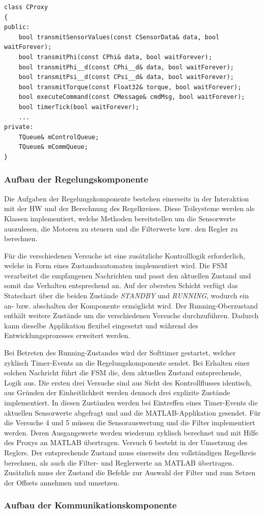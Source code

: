 \documentclass{article}
\begin{document}
\begin{lstlisting}
class CProxy
{
public:
	bool transmitSensorValues(const CSensorData& data, bool waitForever);
	bool transmitPhi(const CPhi& data, bool waitForever);
	bool transmitPhi__d(const CPhi__d& data, bool waitForever);
	bool transmitPsi__d(const CPsi__d& data, bool waitForever);
	bool transmitTorque(const Float32& torque, bool waitForever);
	bool executeCommand(const CMessage& cmdMsg, bool waitForever);
	bool timerTick(bool waitForever);
	...
private:
	TQueue& mControlQueue;
	TQueue& mCommQueue;
}
\end{lstlisting}

\subsubsection{Aufbau der Regelungskomponente}
Die Aufgaben der Regelungskomponente bestehen einerseits in der Interaktion mit der HW und der Berechnung des Regelkreises. Diese Teilsysteme werden als Klassen implementiert, welche Methoden bereitstellen um die Sensorwerte auszulesen, die Motoren zu steuern und die Filterwerte bzw. den Regler zu berechnen.


Für die verschiedenen Versuche ist eine zusätzliche Kontrolllogik erforderlich, welche in Form eines Zustandsautomaten implementiert wird. Die FSM verarbeitet die empfangenen Nachrichten und passt den aktuellen Zustand und somit das Verhalten entsprechend an. Auf der obersten Schicht verfügt das Statechart über die beiden Zustände \textit{STANDBY} und \textit{RUNNING}, wodurch ein an- bzw. abschalten der Komponente ermöglicht wird. Der Running-Oberzustand enthält weitere Zustände um die verschiedenen Versuche durchzuführen. Dadurch kann dieselbe Applikation flexibel eingesetzt und während des Entwicklungsprozesses erweitert werden.


Bei Betreten des Running-Zustandes wird der Softtimer gestartet, welcher zyklisch Timer-Events an die Regelungskomponente sendet. Bei Erhalten einer solchen Nachricht führt die FSM die, dem aktuellen Zustand entsprechende, Logik aus. 
Die ersten drei Versuche sind aus Sicht des Kontrollflusses identisch, aus Gründen der Einheitlichkeit werden dennoch drei explizite Zustände implementiert. In diesen Zuständen werden bei Eintreffen eines Timer-Events die aktuellen Sensorwerte abgefragt und and die MATLAB-Applikation gesendet. Für die Versuche 4 und 5 müssen die Sensorauswertung und die Filter implementiert werden. Deren Ausgangswerte werden wiederum zyklisch berechnet und mit Hilfe des Proxys an MATLAB übertragen. Versuch 6 besteht in der Umsetzung des Reglers. Der entsprechende Zustand muss einerseits den vollständigen Regelkreis berechnen, als auch die Filter- und Reglerwerte an MATLAB übertragen. Zusätzlich muss der Zustand die Befehle zur Auswahl der Filter und zum Setzen der Offsets annehmen und umsetzen.

\subsubsection{Aufbau der Kommunikationskomponente}
\end{document}

